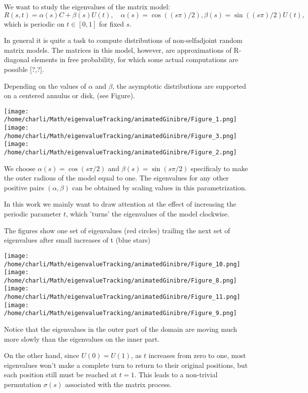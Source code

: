 \documentclass{article}
\begin{document}
	We want to study the eigenvalues of the matrix model:
	$$R(s,t) = \alpha(s)C + \beta(s)U(t),\quad  \alpha(s)= \cos((s\pi)/2), \beta(s)= \sin((s\pi) /2)U(t),$$ 
	which is periodic on $t\in [0,1]$ for fixed $s$.

	In general it is quite a task to compute distributions 
	of non-selfadjoint random matrix models. 
	The matrices in this model, however, 
	are approximations of R-diagonal elements in free probability, 
	for which some actual computations are possible [?,?]. 

	Depending on the values of $\alpha$ and $\beta$, 
	the asymptotic distributions are supported on a centered annulus or disk,  
	(see Figure). 

	\texttt{[image: /home/charli/Math/eigenvalueTracking/animatedGinibre/Figure\_1.png]}
	\texttt{[image: /home/charli/Math/eigenvalueTracking/animatedGinibre/Figure\_3.png]}
	\texttt{[image: /home/charli/Math/eigenvalueTracking/animatedGinibre/Figure\_2.png]}

	We choose $\alpha(s) = \cos(s \pi /2)$ and $\beta(s) = \sin(s \pi /2)$ 
	specificaly to make the outer radious of the model equal to one. 
	The eigenvalues for any other positive pairs $(\alpha, \beta)$ can be obtained 
	by scaling values in this parametrization.
	
	In this work we mainly want to draw attention at the effect of increasing 
	the periodic parameter $t$,
	which 'turns' the eigenvalues of the model clockwise.

	The figures show one set of eigenvalues (red circles) 
	trailing the next set of eigenvalues 
 	after small increases of t (blue stars)
	
	\texttt{[image: /home/charli/Math/eigenvalueTracking/animatedGinibre/Figure\_10.png]} 
	\texttt{[image: /home/charli/Math/eigenvalueTracking/animatedGinibre/Figure\_8.png]} 
	\texttt{[image: /home/charli/Math/eigenvalueTracking/animatedGinibre/Figure\_11.png]} 
	\texttt{[image: /home/charli/Math/eigenvalueTracking/animatedGinibre/Figure\_9.png]}

	Notice that the eigenvalues in the outer part of the domain are moving much more slowly 
	than the eigenvalues on the inner part.

	On the other hand, since $U(0) = U(1)$, as $t$ increases from zero to one, 
	most eigenvalues won't make a complete turn to return to their original positions, 
	but each position still must be reached at $t=1$. 
	This leads to a non-trivial permutation $\sigma(s)$ 
	associated with the matrix process.
	
\end{document}
